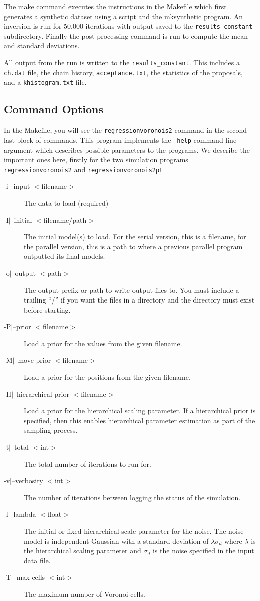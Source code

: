 \documentclass{article}
\begin{document}
The make command executes the instructions in the Makefile
which first generates a synthetic dataset using a script
and the mksynthetic program. An inversion is run for 50,000
iterations with output saved to the {\tt results\_constant}
subdirectory. Finally the post processing command is run to
compute the mean and standard deviations.

All output from the run is written to the {\tt results\_constant}. This
includes a {\tt ch.dat} file, the chain history, {\tt acceptance.txt}, the statistics
of the proposals, and a {\tt khistogram.txt} file.

\subsection{Command Options}

In the Makefile, you will see the {\tt regressionvoronois2} command in the second
last block of commands. This program implements the {\tt --help} command line argument
which describes possible parameters to the programs. We describe the
important ones here, firstly for the two simulation programs {\tt regressionvoronois2}
and {\tt regressionvoronois2pt}

\begin{description}
\item [-i$|$--input $<$filename$>$] The data to load (required)
\item [-I$|$--initial $<$filename/path$>$] The initial model(s) to load. For the serial version,
  this is a filename, for the parallel version, this is a path to where a previous parallel
  program outputted its final models.
\item [-o$|$--output $<$path$>$] The output prefix or path to write output files to. You must include
  a trailing ``/'' if you want the files in a directory and the directory must exist before starting.
\item [-P$|$--prior $<$filename$>$] Load a prior for the values from the given filename.
\item [-M$|$--move-prior $<$filename$>$] Load a prior for the positions from the given filename.
\item [-H$|$--hierarchical-prior $<$filename$>$] Load a prior for the hierarchical scaling parameter. If a
  hierarchical prior is specified, then this enables hierarchical parameter estimation as part of the
  sampling process.
\item [-t$|$--total $<$int$>$] The total number of iterations to run for.
\item [-v$|$--verbosity $<$int$>$] The number of iterations between logging the status of the simulation.
\item [-l$|$--lambda $<$float$>$] The initial or fixed hierarchical scale parameter for the noise. The noise
  model is independent Gaussian with a standard deviation of $\lambda \sigma_d$ where $\lambda$ is
  the hierarchical scaling parameter and $\sigma_d$ is the noise specified in the input data file.
\item [-T$|$--max-cells $<$int$>$] The maximum number of Voronoi cells.
\end{description}
\end{document}
